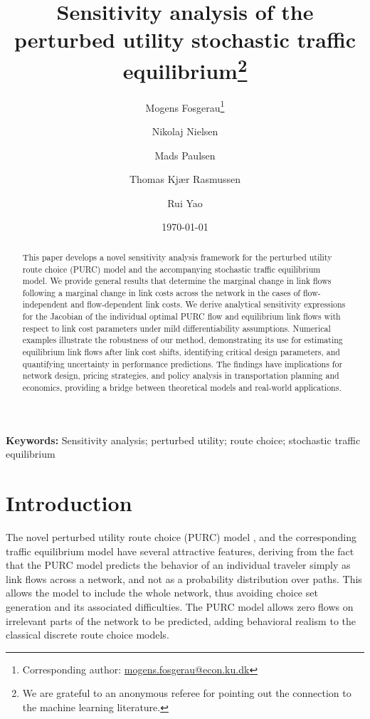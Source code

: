 \documentclass[a4paper,11pt]{article}
\begin{document}
\title{Sensitivity analysis of the\\ perturbed utility stochastic traffic equilibrium\thanks{We are grateful to an anonymous referee for pointing out the connection to the machine learning literature. }}
\author[a]{Mogens Fosgerau\footnote{Corresponding author: \url{mogens.fosgerau@econ.ku.dk}}}
\author[a]{Nikolaj Nielsen}
\author[b]{Mads Paulsen}
\author[b]{Thomas Kjær Rasmussen}
\author[c]{Rui Yao}
\date{\today}
\maketitle

\begin{abstract}
This paper develops a novel sensitivity analysis framework for the perturbed utility route choice (PURC) model and the accompanying stochastic traffic equilibrium model. We provide general results that determine the marginal change in link flows following a marginal change in link costs across the network in the cases of flow-independent and flow-dependent link costs. We derive analytical sensitivity expressions for the Jacobian of the individual optimal PURC flow and equilibrium link flows with respect to link cost parameters under mild differentiability assumptions.
Numerical examples illustrate the robustness of our method, demonstrating its use for estimating equilibrium link flows after link cost shifts, identifying critical design parameters, and quantifying uncertainty in performance predictions. The findings have implications for network design, pricing strategies, and policy analysis in transportation planning and economics, providing a bridge between theoretical models and real-world applications. 

\end{abstract}

\bigskip

\noindent \textbf{Keywords:} Sensitivity analysis; perturbed utility; route choice; stochastic traffic equilibrium


\section{Introduction}

The novel perturbed utility route choice (PURC) model \citep{Fosgerau2021a,fosgerau_bikeability_2023}, and the corresponding traffic equilibrium model \citep{yao_perturbed_2024} have several attractive features, deriving from the fact that the PURC model predicts the behavior of an individual traveler simply as link flows across a network, and not as a probability distribution over paths. This allows the model to include the whole network, thus avoiding choice set generation and its associated difficulties. The PURC model allows zero flows on irrelevant parts of the network to be predicted, adding behavioral realism to the classical discrete route choice models. 
\end{document}
